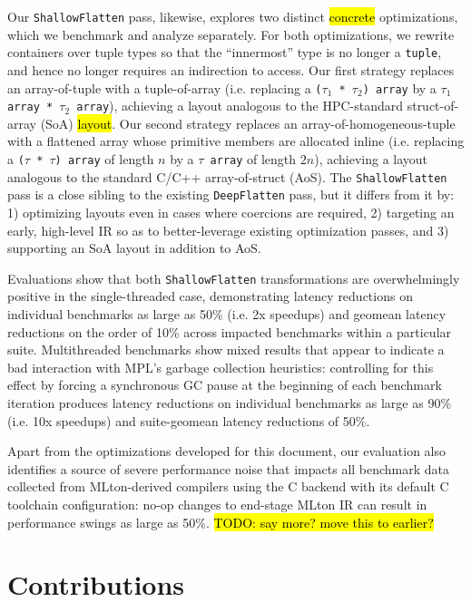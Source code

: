Our \texttt{ShallowFlatten} pass, likewise, explores two distinct \hl{concrete}
optimizations, which we benchmark and analyze separately. For both
optimizations, we rewrite containers over tuple types so that the ``innermost''
type is no longer a \texttt{tuple}, and hence no longer requires an indirection
to access. Our first strategy replaces an array-of-tuple with a tuple-of-array
(i.e. replacing a \texttt{($\tau_1$ * $\tau_2$) array} by a \texttt{$\tau_1$
array * $\tau_2$ array}), achieving a layout analogous to the HPC-standard
struct-of-array (SoA) \hl{layout}. Our second strategy replaces an
array-of-homogeneous-tuple with a flattened array whose primitive members are
allocated inline (i.e. replacing a \texttt{($\tau$ * $\tau$) array} of length
$n$ by a \texttt{$\tau$ array} of length $2n$), achieving a layout analogous to
the standard C/C++ array-of-struct (AoS). The \texttt{ShallowFlatten} pass is a
close sibling to the existing \texttt{DeepFlatten} pass, but it differs from it
by: 1) optimizing layouts even in cases where coercions are required, 2)
targeting an early, high-level IR so as to better-leverage existing
optimization passes, and 3) supporting an SoA layout in addition to AoS.


Evaluations show that both \texttt{ShallowFlatten} transformations are
overwhelmingly positive in the single-threaded case, demonstrating latency
reductions on individual benchmarks as large as 50\% (i.e. 2x speedups) and
geomean latency reductions on the order of 10\% across impacted benchmarks
within a particular suite. Multithreaded benchmarks show mixed results that
appear to indicate a bad interaction with MPL's garbage collection heuristics:
controlling for this effect by forcing a synchronous GC pause at the beginning
of each benchmark iteration produces latency reductions on individual benchmarks
as large as 90\% (i.e. 10x speedups) and suite-geomean latency reductions of
50\%.

Apart from the optimizations developed for this document, our evaluation also
identifies a source of severe performance noise that impacts all benchmark data
collected from MLton-derived compilers using the C backend with its default C
toolchain configuration: no-op changes to end-stage MLton IR can result in
performance swings as large as 50\%. \hl{TODO: say more? move this to earlier?}

\section{Contributions}

